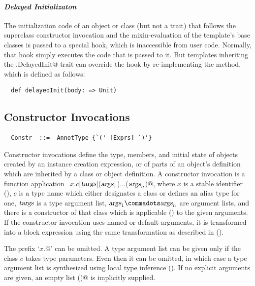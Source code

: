 \paragraph{\em Delayed Initializaton}
The initialization code of an object or class (but not a trait) that follows the superclass
constructor invocation and the mixin-evaluation of the template's base
classes is passed to a special hook, which is inaccessible from user
code. Normally, that hook simply executes the code that is passed to
it. But templates inheriting the \lstinline@scala.DelayedInit@ trait
can override the hook by re-implementing the \lstinline@delayedInit@
method, which is defined as follows:

\begin{lstlisting}
  def delayedInit(body: => Unit)
\end{lstlisting}


\subsection{Constructor Invocations}
\label{sec:constr-invoke}
\syntax\begin{lstlisting}
  Constr  ::=  AnnotType {`(' [Exprs] `)'}
\end{lstlisting}

Constructor invocations define the type, members, and initial state of
objects created by an instance creation expression, or of parts of an
object's definition which are inherited by a class or object
definition. A constructor invocation is a function application
~\lstinline@$x$.$c$[$\mbox{\sl targs}$]($\mbox{\sl args}_1$)$\ldots$($\mbox{\sl args}_n$)@, where $x$ is a stable identifier
(), $c$ is a type name which either designates a
class or defines an alias type for one, $\mbox{\sl targs}$ is a type argument
list, $\args_1 \commadots \args_n$ are argument lists, and there is a
constructor of that class which is applicable ()
to the given arguments. If the constructor invocation uses named or
default arguments, it is transformed into a block expression using the
same transformation as described in ().

The prefix `\lstinline@$x$.@' can be omitted.  A type argument list
can be given only if the class $c$ takes type parameters.  Even then
it can be omitted, in which case a type argument list is synthesized
using local type inference (). If no explicit
arguments are given, an empty list \lstinline@()@ is implicitly supplied.

